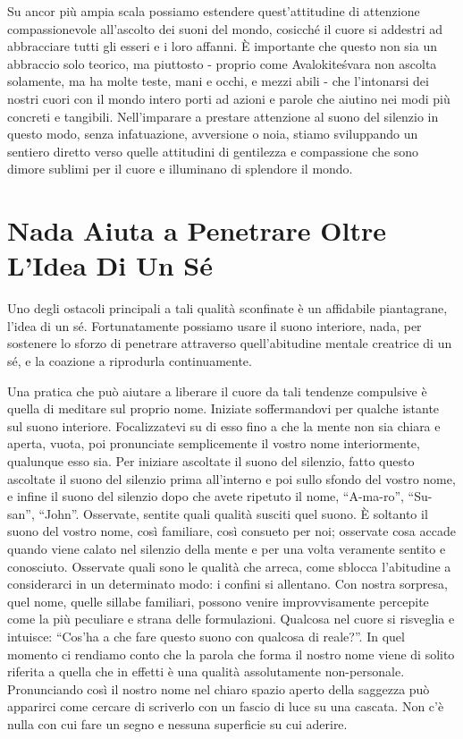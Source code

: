 Su ancor più ampia scala possiamo estendere quest'attitudine di
attenzione compassionevole all'ascolto dei suoni del mondo, cosicché il
cuore si addestri ad abbracciare tutti gli esseri e i loro affanni. È
importante che questo non sia un abbraccio solo teorico, ma piuttosto -
proprio come Avalokiteśvara non ascolta solamente, ma ha molte teste,
mani e occhi, e mezzi abili - che l'intonarsi dei nostri cuori con il
mondo intero porti ad azioni e parole che aiutino nei modi più concreti
e tangibili. Nell'imparare a prestare attenzione al suono del silenzio
in questo modo, senza infatuazione, avversione o noia, stiamo
sviluppando un sentiero diretto verso quelle attitudini di gentilezza e
compassione che sono dimore sublimi per il cuore e illuminano di
splendore il mondo.

\section{Nada Aiuta a Penetrare Oltre L'Idea Di Un Sé}

Uno degli ostacoli principali a tali qualità sconfinate è un affidabile
piantagrane, l'idea di un sé. Fortunatamente possiamo usare il suono
interiore, nada, per sostenere lo sforzo di penetrare attraverso
quell'abitudine mentale creatrice di un sé, e la coazione a riprodurla
continuamente.

Una pratica che può aiutare a liberare il cuore da tali tendenze
compulsive è quella di meditare sul proprio nome. Iniziate soffermandovi
per qualche istante sul suono interiore. Focalizzatevi su di esso fino a
che la mente non sia chiara e aperta, vuota, poi pronunciate
semplicemente il vostro nome interiormente, qualunque esso sia. Per
iniziare ascoltate il suono del silenzio, fatto questo ascoltate il
suono del silenzio prima all'interno e poi sullo sfondo del vostro nome,
e infine il suono del silenzio dopo che avete ripetuto il nome,
``A-ma-ro'', ``Su-san'', ``John''. Osservate, sentite quali qualità
susciti quel suono. È soltanto il suono del vostro nome, così familiare,
così consueto per noi; osservate cosa accade quando viene calato nel
silenzio della mente e per una volta veramente sentito e conosciuto.
Osservate quali sono le qualità che arreca, come sblocca l'abitudine a
considerarci in un determinato modo: i confini si allentano. Con nostra
sorpresa, quel nome, quelle sillabe familiari, possono venire
improvvisamente percepite come la più peculiare e strana delle
formulazioni. Qualcosa nel cuore si risveglia e intuisce: ``Cos'ha a che
fare questo suono con qualcosa di reale?''. In quel momento ci rendiamo
conto che la parola che forma il nostro nome viene di solito riferita a
quella che in effetti è una qualità assolutamente non-personale.
Pronunciando così il nostro nome nel chiaro spazio aperto della saggezza
può apparirci come cercare di scriverlo con un fascio di luce su una
cascata. Non c'è nulla con cui fare un segno e nessuna superficie su cui
aderire.

